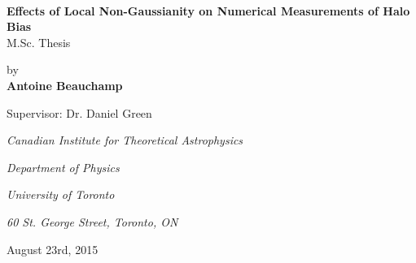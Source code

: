 \documentclass[10pt,letterpaper,final]{iopart}
\numberwithin{equation}{subsection}
\begin{document}
%
%

\begin{titlepage}


\setcounter{page}{1} 
\baselineskip=14.5pt
\thispagestyle{empty}




\bigskip\

\begin{center}
{\fontsize{16}{20}\selectfont \bfseries Effects of Local Non-Gaussianity on Numerical Measurements of Halo Bias }\\
\vspace{0.75cm}
{\fontsize{14}{36}\selectfont   M.Sc. Thesis}
\end{center}


\begin{center}
\vspace{0.4cm}
{\fontsize{12}{15}\selectfont   by\\
 }
\vspace{0.4cm}
{\fontsize{12}{15}\selectfont   \bf  Antoine Beauchamp\\
 }
\end{center}


\begin{center}
{\fontsize{12}{15}\selectfont   Supervisor: Dr. Daniel Green }
\end{center}

\vspace{0.6cm}


\begin{center}

\textsl{Canadian Institute for Theoretical Astrophysics}

\vspace{0.1cm}

\textsl{Department of Physics}

\vspace{0.1cm}

\textsl{University of Toronto}

\vspace{0.1cm}

\textsl{60 St. George Street, Toronto, ON}


\end{center} 

\vspace{0.6cm}

\begin{center}
{\fontsize{10}{15}\selectfont August 23rd, 2015}
\end{center}





\end{titlepage}
\end{document}
